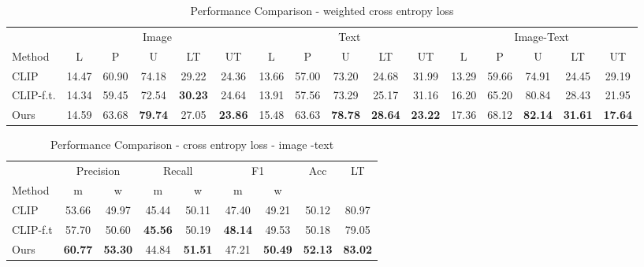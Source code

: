 \begin{table*}
    \centering
    \caption{Performance Comparison - weighted cross entropy loss}
    \label{tab: baselines4}

    \begin{tabular}{l|ccccc|ccccc|ccccc }
    \hline

             & \multicolumn{5}{c|}{Image} 
             & \multicolumn{5}{c|}{Text} 
             & \multicolumn{5}{c}{Image-Text} \\ 
        \cline{2-16}
             \cline{2-16}
        Method & L&P& U&LT& UT& L&P& U&LT& UT& L&P& U&LT& UT   \\ 
        \hline
        CLIP & 14.47 & 60.90 & 74.18 & 29.22 & 24.36 & 13.66 & 57.00 & 73.20 & 24.68 & 31.99 & 13.29 & 59.66 & 74.91 & 24.45 & 29.19  \\
        CLIP-f.t. & 14.34 & 59.45 & 72.54 & \textbf{30.23} & 24.64 & 13.91 & 57.56 & 73.29 & 25.17 & 31.16 & 16.20 & 65.20 & 80.84 & 28.43 & 21.95  \\
        Ours & 14.59 & 63.68 & \textbf{79.74} & 27.05 & \textbf{23.86} & 15.48 & 63.63 & \textbf{78.78} & \textbf{28.64} & \textbf{23.22} & 17.36 & 68.12 & \textbf{82.14} & \textbf{31.61} & \textbf{17.64}  \\
        
        \hline
        
    \end{tabular}    
\end{table*}


\begin{table*}
    \centering
    \caption{Performance Comparison - cross entropy loss - image -text}
    \label{tab: baselines3}

    \begin{tabular}{l|cc|cc|cc|c|c }
    \hline
            & \multicolumn{2}{c|}{Precision} 
             & \multicolumn{2}{c|}{Recall} 
             & \multicolumn{2}{c|}{F1} 
             & \multicolumn{1}{c|}{Acc} 
             & \multicolumn{1}{c}{LT} \\

        Method & m&w& m&w& m&w& &\\ 
        \hline
        CLIP & 53.66&49.97&45.44&50.11&47.40&49.21&50.12&80.97\\
        CLIP-f.t& 57.70&50.60&\textbf{45.56}&50.19&\textbf{48.14}&49.53&50.18&79.05\\
        Ours&\textbf{60.77}&\textbf{53.30}&44.84&\textbf{51.51}&47.21&\textbf{50.49}&\textbf{52.13}&\textbf{83.02}\\
        \hline
        
    \end{tabular}    
\end{table*}
